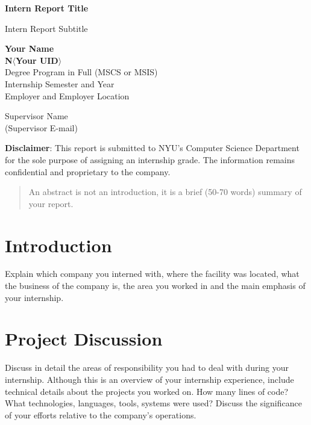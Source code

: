 \documentclass[12pt]{report}
\begin{document}
\begin{titlepage}
    \begin{center}
        \vspace*{1cm}
        \Huge
        \textbf{Intern Report Title}
        
        \Large
        \vspace{0.1cm}
        Intern Report Subtitle
        
        \LARGE
        \vspace{0.5cm}
        \textbf{Your Name} \\
        \textbf{N$\langle$Your UID$\rangle$} \\
        Degree Program in Full (MSCS or MSIS) \\
        
        \vfill
        \Large
        Internship Semester and Year \\
        Employer and Employer Location

        \vspace{0.5cm}
        Supervisor Name \\ 
        (Supervisor E-mail)
    \end{center}
    \textbf{Disclaimer}: This report is submitted to NYU’s Computer Science Department for the sole purpose of assigning an internship grade. The information remains confidential and proprietary to the company.
\end{titlepage}

\begin{abstract}
An abstract is not an introduction, it is a brief (50-70 words) summary of your report.
\end{abstract}

\section*{Introduction}
Explain which company you interned with, where the facility was located, what the business of the company is, the area you worked in and the main emphasis of your internship.

\section*{Project Discussion}
Discuss in detail the areas of responsibility you had to deal with during your internship. Although this is an overview of your internship experience, include technical details about the projects you worked on. How many lines of code? What technologies, languages, tools, systems were used? Discuss the significance of your efforts relative to the company’s operations.
\end{document}
